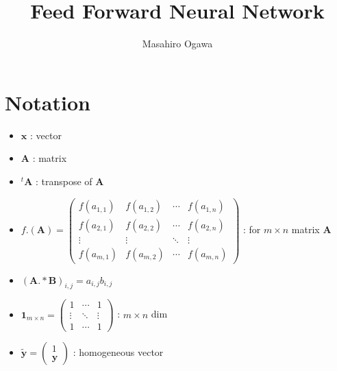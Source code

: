 \documentclass{article}
\title{Feed Forward Neural Network}
\author{Masahiro Ogawa}
\begin{document}
\maketitle

\section{Notation}
\begin{itemize}
\item $\bm{x}$ : vector
\item $\bm{A}$ : matrix
\item ${}^t\bm{A}$ : transpose of $\bm{A}$
\item $f.(\bm{A}) = 
 \begin{pmatrix}
  f(a_{1,1}) & f(a_{1,2}) & \cdots & f(a_{1,n}) \\
  f(a_{2,1}) & f(a_{2,2}) & \cdots & f(a_{2,n}) \\
  \vdots  & \vdots  & \ddots & \vdots  \\

  f(a_{m,1}) & f(a_{m,2}) & \cdots & f(a_{m,n})
 \end{pmatrix}$ : for $m \times n$ matrix $\bm{A}$
\item $(\bm{A}.*\bm{B})_{i,j} = a_{i,j}b_{i,j}$
\item $\bm{1}_{m\times n} = 
  \begin{pmatrix}
    1 & \cdots & 1 \\
    \vdots & \ddots & \vdots \\
    1 & \cdots & 1 
  \end{pmatrix}$ : $m \times n$ dim
\item $\bm{\tilde{y}} = 
  \begin{pmatrix}
    1 \\
    \bm{y}
  \end{pmatrix}$ : homogeneous vector


\end{itemize}
\end{document}

